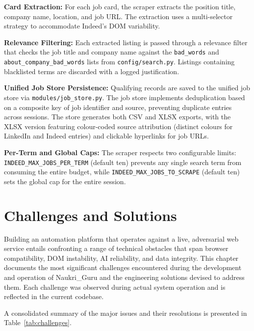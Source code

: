\documentclass[12pt, a4paper, oneside]{report}
\begin{document}
\textbf{Card Extraction:} For each job card, the scraper extracts the position title, company name, location, and job URL. The extraction uses a multi-selector strategy to accommodate Indeed's DOM variability.

\textbf{Relevance Filtering:} Each extracted listing is passed through a relevance filter that checks the job title and company name against the \texttt{bad\_words} and \texttt{about\_company\_bad\_words} lists from \texttt{config/search.py}. Listings containing blacklisted terms are discarded with a logged justification.

\textbf{Unified Job Store Persistence:} Qualifying records are saved to the unified job store via \texttt{modules/job\_store.py}. The job store implements deduplication based on a composite key of job identifier and source, preventing duplicate entries across sessions. The store generates both CSV and XLSX exports, with the XLSX version featuring colour-coded source attribution (distinct colours for LinkedIn and Indeed entries) and clickable hyperlinks for job URLs.

\textbf{Per-Term and Global Caps:} The scraper respects two configurable limits: \texttt{INDEED\_MAX\_JOBS\_PER\_TERM} (default ten) prevents any single search term from consuming the entire budget, while \texttt{INDEED\_MAX\_JOBS\_TO\_SCRAPE} (default ten) sets the global cap for the entire session.


\chapter{Challenges and Solutions}
\label{chap:challenges}

Building an automation platform that operates against a live, adversarial web service entails confronting a range of technical obstacles that span browser compatibility, DOM instability, AI reliability, and data integrity. This chapter documents the most significant challenges encountered during the development and operation of Naukri\_Guru and the engineering solutions devised to address them. Each challenge was observed during actual system operation and is reflected in the current codebase.

A consolidated summary of the major issues and their resolutions is presented in Table~\ref{tab:challenges}.
\end{document}
